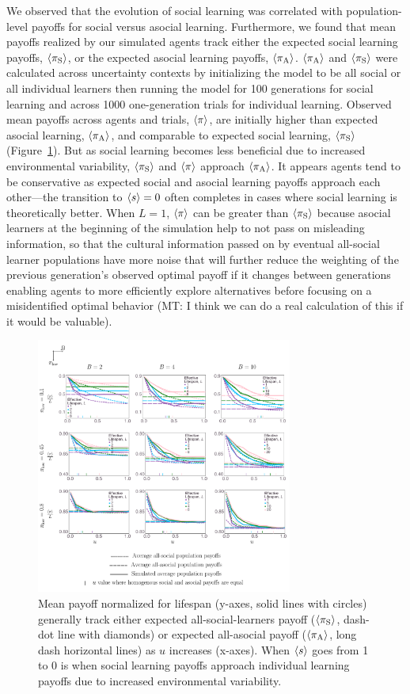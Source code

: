\documentclass[letterpaper,11.5pt]{scrartcl}
\newcommand{\mt}[1]{{\textcolor{myorange} {({\tiny MT:} #1)}}}
\begin{document}
We observed that the evolution of social learning was correlated with
population-level payoffs for social versus asocial learning. Furthermore, we
found that mean payoffs realized by our simulated agents track either the
expected social learning payoffs, $\langle \pi_\mathrm{S} \rangle$, or the expected asocial learning
payoffs, $\langle \pi_\mathrm{A} \rangle$. $\langle \pi_\mathrm{A} \rangle$ and $\langle \pi_\mathrm{S} \rangle$ were calculated
across uncertainty contexts by initializing the model to be all social or all
individual learners then running the model for 100 generations for social learning
and across 1000 one-generation trials for individual learning. 
Observed mean payoffs across agents and trials, $\langle \pi \rangle$, are initially higher than
expected asocial learning, $\langle \pi_\mathrm{A} \rangle$, and comparable to expected social learning,
$\langle \pi_\mathrm{S} \rangle$ (Figure~\ref{fig:payoffs}). But as social learning becomes less
beneficial due to increased environmental variability, $\langle \pi_\mathrm{S} \rangle$ and $\langle \pi \rangle$
approach $\langle \pi_\mathrm{A} \rangle$. It appears agents tend to be conservative as expected
social and asocial learning payoffs approach each other---the transition to 
$\langle s \rangle = 0$ often completes in cases where social learning is theoretically
better. When $L=1$, $\langle \pi \rangle$ can be greater than $\langle \pi_\mathrm{S} \rangle$
because asocial learners at the beginning of the simulation help to not pass
on misleading information, so that the cultural information passed on by 
eventual all-social learner populations have more noise that will further reduce the
weighting of the previous generation's observed optimal payoff if it changes
between generations enabling agents to more efficiently explore alternatives
before focusing on a misidentified optimal behavior \mt{I think we can do a
real calculation of this if it would be valuable}. 

\begin{figure}
  \caption{Mean payoff normalized for lifespan (y-axes, solid lines with circles)
    generally track either expected all-social-learners payoff ($\langle \pi_\mathrm{S} \rangle$, dash-dot
    line with diamonds) or expected all-asocial payoff ($\langle \pi_\mathrm{A} \rangle$, long dash
    horizontal lines) as $u$ increases (x-axes). When $\langle s \rangle$ goes from 1 to
  0 is when social learning payoffs approach individual learning payoffs due to
increased environmental variability.} 
  \label{fig:payoffs}
\centering
    \includegraphics[width=0.75\textwidth]{Figures/meanNetPayoffs.pdf}
\end{figure}
\end{document}
